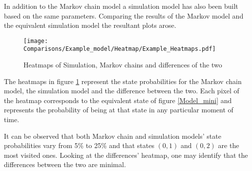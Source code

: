 In addition to the Markov chain model a simulation model has also been built based on the same parameters. Comparing the results of the Markov model and the equivalent simulation model the resultant plots arose.

\begin{figure}[h]
    \texttt{[image: Comparisons/Example\_model/Heatmap/Example\_Heatmaps.pdf]}
    \caption{Heatmaps of Simulation, Markov chains and differences of the two}
    \label{Heatmap_mini}
\end{figure}
  
The heatmaps in figure \ref{Heatmap_mini} represent the state probabilities for the Markov chain model, the simulation model and the difference between the two. Each pixel of the heatmap corresponds to the equivalent state of figure \ref{Model_mini} and represents the probability of being at that state in any particular moment of time.

It can be observed that both Markov chain and simulation models' state probabilities vary from 5\% to 25\% and that states \( (0, 1) \) and \( (0, 2) \) are the most visited ones. Looking at the differences' heatmap, one may identify that the differences between the two are minimal.

